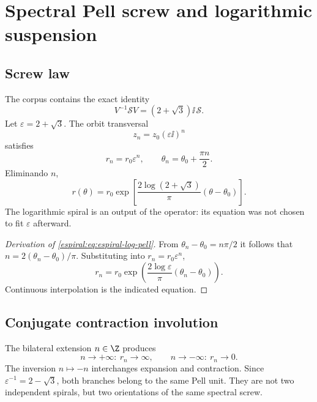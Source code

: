 
\chapter{Spectral Pell screw and logarithmic suspension}

\section{Screw law}

The corpus contains the exact identity
\begin{equation}
 V^{-1}\mathscr S V=(2+\sqrt3)\ii\,\mathscr S.
 \label{espiral:eq:tornillo-pell}
\end{equation}
Let \(\varepsilon=2+\sqrt3\). The orbit transversal
\[
 z_n=z_0(\varepsilon\ii)^n
\]
satisfies
\[
 r_n=r_0\varepsilon^n,
 \qquad
 \theta_n=\theta_0+\frac{\pi n}{2}.
\]
Eliminando \(n\),
\begin{equation}
 r(\theta)=r_0
 \exp\!\left[
 \frac{2\log(2+\sqrt3)}{\pi}
 (\theta-\theta_0)
 \right].
 \label{espiral:eq:espiral-log-pell}
\end{equation}
The logarithmic spiral is an output of the operator: its equation was not chosen
to fit \(\varepsilon\) afterward.

\begin{proof}[Derivation of \cref{espiral:eq:espiral-log-pell}]
From \(\theta_n-\theta_0=n\pi/2\) it follows that
\(n=2(\theta_n-\theta_0)/\pi\). Substituting into
\(r_n=r_0\varepsilon^n\),
\[
 r_n=r_0\exp\left(
 \frac{2\log\varepsilon}{\pi}(\theta_n-\theta_0)
 \right).
\]
Continuous interpolation is the indicated equation.
\end{proof}

\section{Conjugate contraction involution}

The bilateral extension \(n\in\Z\) produces
\[
 n\to+\infty:\ r_n\to\infty,
 \qquad
 n\to-\infty:\ r_n\to0.
\]
The inversion \(n\mapsto-n\) interchanges expansion and contraction. Since
\(\varepsilon^{-1}=2-\sqrt3\), both branches belong to the same Pell unit.
They are not two independent spirals, but two orientations of the same
spectral screw.

